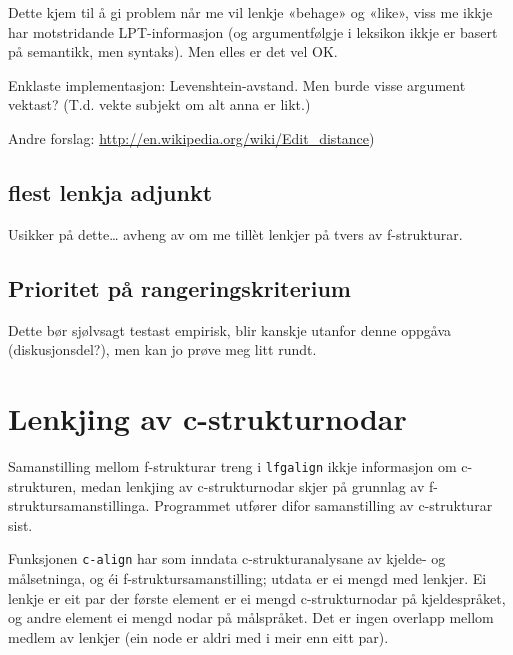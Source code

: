 \documentclass[11pt,a4paper,oneside,draft]{book}
\begin{document}
    Dette kjem til å gi problem når me vil lenkje «behage» og «like»,
    viss me ikkje har motstridande LPT-informasjon (og argumentfølgje
    i leksikon ikkje er basert på semantikk, men syntaks). Men elles
    er det vel OK.

    Enklaste implementasjon: Levenshtein-avstand. Men burde visse
    argument vektast? (T.d. vekte subjekt om alt anna er likt.)

    Andre forslag: \href{http://en.wikipedia.org/wiki/Edit_distance}{http://en.wikipedia.org/wiki/Edit\_distance})
\subsection{flest lenkja adjunkt}
\label{sec-4.2.4}

    Usikker på dette\ldots{} avheng av om me tillèt lenkjer på tvers av
    f-strukturar.
\subsection{Prioritet på rangeringskriterium}
\label{sec-4.2.5}

    Dette bør sjølvsagt testast empirisk, blir kanskje utanfor denne
    oppgåva (diskusjonsdel?), men kan jo prøve meg litt rundt.
\section{Lenkjing av c-strukturnodar}
\label{sec-4.3}

Samanstilling mellom f-strukturar treng i \texttt{lfgalign} ikkje informasjon
om c-strukturen, medan lenkjing av c-strukturnodar skjer på grunnlag
av f-struktursamanstillinga. Programmet utfører difor samanstilling av
c-strukturar sist.

Funksjonen \texttt{c-align} har som inndata c-strukturanalysane av kjelde- og
målsetninga, og éi f-struktursamanstilling; utdata er ei mengd med
lenkjer. Ei lenkje er eit par der første element er ei mengd
c-strukturnodar på kjeldespråket, og andre element ei mengd nodar på
målspråket. Det er ingen overlapp mellom medlem av lenkjer (ein node
er aldri med i meir enn eitt par).
\end{document}
